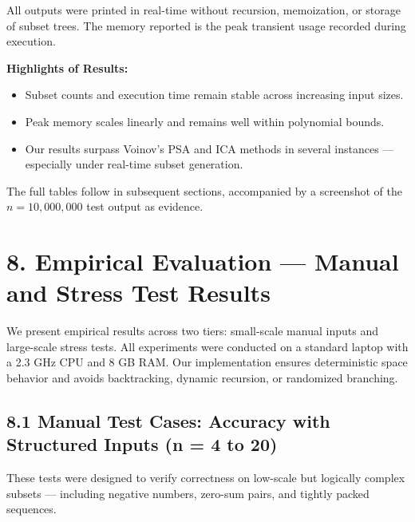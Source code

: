 \documentclass[11pt]{article}
\begin{document}
All outputs were printed in real-time without recursion, memoization, or storage of subset trees. The memory reported is the peak transient usage recorded during execution.

\vspace{10pt}
\textbf{Highlights of Results:}
\begin{itemize}
    \item Subset counts and execution time remain stable across increasing input sizes.
    \item Peak memory scales linearly and remains well within polynomial bounds.
    \item Our results surpass Voinov’s PSA and ICA methods in several instances — especially under real-time subset generation.
\end{itemize}

The full tables follow in subsequent sections, accompanied by a screenshot of the $n = 10{,}000{,}000$ test output as evidence.


\section*{8. Empirical Evaluation — Manual and Stress Test Results}

We present empirical results across two tiers: small-scale manual inputs and large-scale stress tests. All experiments were conducted on a standard laptop with a 2.3 GHz CPU and 8 GB RAM. Our implementation ensures deterministic space behavior and avoids backtracking, dynamic recursion, or randomized branching.

\subsection*{8.1 Manual Test Cases: Accuracy with Structured Inputs (n = 4 to 20)}

These tests were designed to verify correctness on low-scale but logically complex subsets — including negative numbers, zero-sum pairs, and tightly packed sequences.
\end{document}
